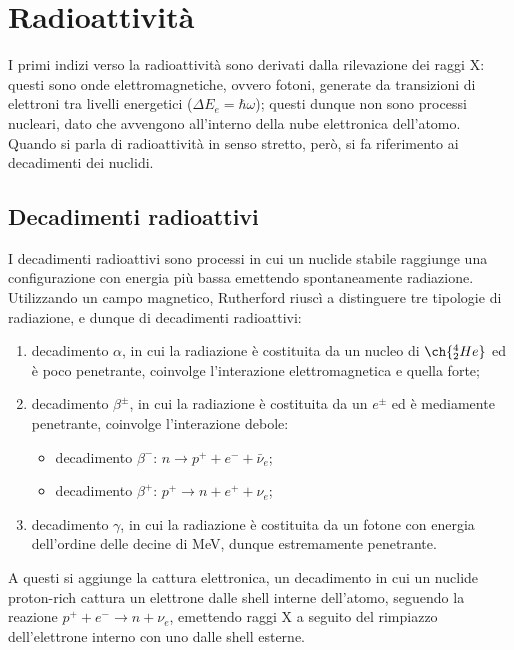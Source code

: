 
\section{Radioattività}

I primi indizi verso la radioattività sono derivati dalla rilevazione dei raggi X: questi sono onde elettromagnetiche, ovvero fotoni, generate da transizioni di elettroni tra livelli energetici ($ \Delta E_e = \hbar \omega $); questi dunque non sono processi nucleari, dato che avvengono all'interno della nube elettronica dell'atomo.\\
Quando si parla di radioattività in senso stretto, però, si fa riferimento ai decadimenti dei nuclidi.

\subsection{Decadimenti radioattivi}

I decadimenti radioattivi sono processi in cui un nuclide stabile raggiunge una configurazione con energia più bassa emettendo spontaneamente radiazione.\\
Utilizzando un campo magnetico, Rutherford riuscì a distinguere tre tipologie di radiazione, e dunque di decadimenti radioattivi:
\begin{enumerate}
  \item decadimento $ \alpha $, in cui la radiazione è costituita da un nucleo di $ \ch{^4_2 He} $ ed è poco penetrante, coinvolge l'interazione elettromagnetica e quella forte;
  \item decadimento $ \beta^{\pm} $, in cui la radiazione è costituita da un $ e^{\pm} $ ed è mediamente penetrante, coinvolge l'interazione debole:
    \begin{itemize}
      \item decadimento $ \beta^- $: $ n \rightarrow p^+ + e^- + \bar{\nu}_e $;
      \item decadimento $ \beta^+ $: $ p^+ \rightarrow n + e^+ + \nu_e $;
    \end{itemize}
  \item decadimento $ \gamma $, in cui la radiazione è costituita da un fotone con energia dell'ordine delle decine di MeV, dunque estremamente penetrante.
\end{enumerate}
A questi si aggiunge la cattura elettronica, un decadimento in cui un nuclide proton-rich cattura un elettrone dalle shell interne dell'atomo, seguendo la reazione $ p^+ + e^- \rightarrow n + \nu_e $, emettendo raggi X a seguito del rimpiazzo dell'elettrone interno con uno dalle shell esterne.

